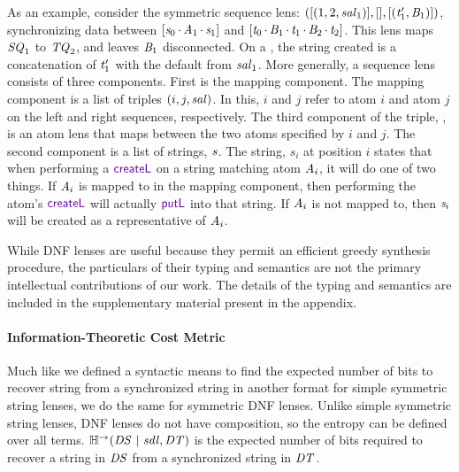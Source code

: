 \documentclass[acmsmall,screen,anonymous]{acmart}
\begin{document}
As an example, consider the symmetric sequence lens:
$([(1,2,\mathit{sal}_1)] ,[  ]
,[ (\mathit{t}_1',\mathit{B}_1) ])$, synchronizing data between
$[\mathit{s}_0 \mkern-1mu\cdot\mkern-1mu \mathit{A}_1 \mkern-1mu\cdot\mkern-1mu \mathit{s}_1]$ and
$[\mathit{t}_0 \mkern-1mu\cdot\mkern-1mu \mathit{B}_1 \mkern-1mu\cdot\mkern-1mu \mathit{t}_1 \mkern-1mu\cdot\mkern-1mu
  \mathit{B}_2 \mkern-1mu\cdot\mkern-1mu \mathit{t}_2]$. This lens maps $\mathit{SQ}_1$ to
$\mathit{TQ}_2$, and leaves $\mathit{B}_1$ disconnected. On a \CreateR, the
string created is a concatenation of $\mathit{t}_1'$ with the default from
$\mathit{sal}_1$. More generally, a sequence lens \SSQLens{} consists of three
components. First is the mapping component. The mapping component is a list of
triples $(i,j,\mathit{sal})$. In this, $i$ and $j$ refer to atom $i$ and atom $j$
on the left and right sequences, respectively. The third component of the
triple, \SAtomLens{}, is an atom lens that maps between the two atoms specified
by $i$ and $j$. The second component is a list of strings, $\mathit{s}$. The
string, $s_i$ at position $i$ states that when performing a $\CreateL$ on a
string matching atom $\mathit{A}_i$, it will do one of two things. If $\mathit{A}_i$ is
mapped to in the mapping component, then performing the atom's $\CreateL$ will
actually $\PutL$ into that string. If $\mathit{A}_i$ is not mapped to, then
$\mathit{s}_i$ will be created as a representative of $\mathit{A}_i$.

While DNF lenses are useful because they permit an efficient greedy synthesis
procedure, the particulars of their typing and semantics are not the primary
intellectual contributions of our work. The details of the typing and semantics
are included in the supplementary material present in the appendix.

\paragraph*{Information-Theoretic Cost Metric}
Much like we defined a syntactic means to find the expected number of bits to
recover string from a synchronized string in another format for simple symmetric
string lenses, we do the same for symmetric DNF lenses. Unlike simple symmetric
string lenses, DNF lenses do not have composition, so the entropy can be defined
over all terms. $\mathbb{H}^\rightarrow(\mathit{DS} ~|~ \mathit{sdl}, \mathit{DT})$ is the
expected number of bits required to recover a string in $\mathit{DS}$ from a
synchronized string in $\mathit{DT}$.
\end{document}
